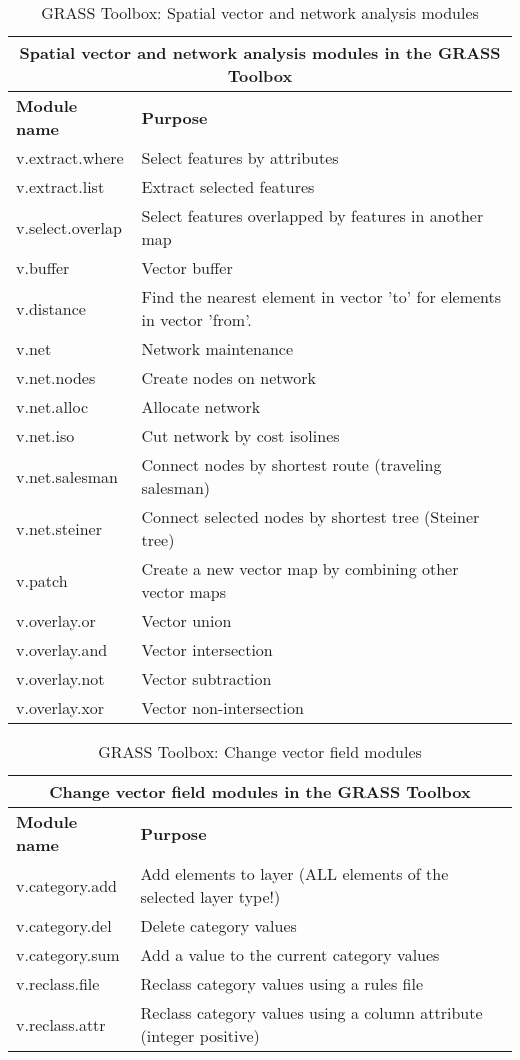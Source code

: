\begin{table}[ht]
\centering
\caption{GRASS Toolbox: Spatial vector and network analysis modules}\medskip
 \begin{tabular}{|p{4cm}|p{12cm}|}
  \hline \multicolumn{2}{|c|}{\textbf{Spatial vector and network analysis modules in the GRASS
  Toolbox}} \\
  \hline \textbf{Module name} & \textbf{Purpose} \\
  \hline v.extract.where & Select features by attributes \\
  \hline v.extract.list & Extract selected features \\
  \hline v.select.overlap & Select features overlapped by features in another
  map\\
  \hline v.buffer & Vector buffer \\
  \hline v.distance & Find the nearest element in vector 'to' for elements in
  vector 'from'. \\
  \hline v.net & Network maintenance \\
  \hline v.net.nodes & Create nodes on network \\
  \hline v.net.alloc & Allocate network\\
  \hline v.net.iso & Cut network by cost isolines \\
  \hline v.net.salesman & Connect nodes by shortest route (traveling
  salesman) \\
  \hline v.net.steiner & Connect selected nodes by shortest tree (Steiner
  tree) \\
  \hline v.patch & Create a new vector map by combining other vector maps \\
  \hline v.overlay.or & Vector union \\
  \hline v.overlay.and & Vector intersection \\
  \hline v.overlay.not & Vector subtraction \\
  \hline v.overlay.xor & Vector non-intersection \\
\hline
\end{tabular}
\end{table}


\begin{table}[ht]
\centering
\caption{GRASS Toolbox: Change vector field modules}\medskip
 \begin{tabular}{|p{4cm}|p{12cm}|}
  \hline \multicolumn{2}{|c|}{\textbf{Change vector field modules in the GRASS
  Toolbox}} \\
  \hline \textbf{Module name} & \textbf{Purpose} \\
  \hline v.category.add & Add elements to layer (ALL elements of the selected
  layer type!)\\
  \hline v.category.del & Delete category values \\
  \hline v.category.sum & Add a value to the current category values \\
  \hline v.reclass.file & Reclass category values using a rules file \\
  \hline v.reclass.attr & Reclass category values using a column attribute
  (integer positive) \\
\hline
\end{tabular}
\end{table}


